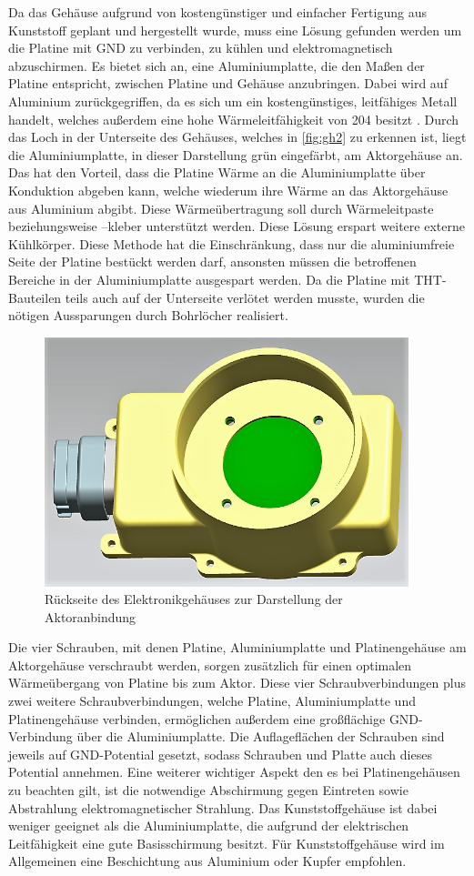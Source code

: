 Da das Gehäuse aufgrund von kostengünstiger und einfacher Fertigung aus Kunststoff geplant und hergestellt wurde, muss eine Lösung gefunden werden um die Platine mit GND zu verbinden, zu kühlen und elektromagnetisch abzuschirmen. Es bietet sich an, eine Aluminiumplatte, die den Maßen der Platine entspricht, zwischen Platine und Gehäuse anzubringen. Dabei wird auf Aluminium zurückgegriffen, da es sich um ein kostengünstiges, leitfähiges Metall handelt, welches außerdem eine hohe Wärmeleitfähigkeit von \SI{204}{} besitzt \cite[S.4]{wuerth}. 
Durch das Loch in der Unterseite des Gehäuses, welches in \autoref{fig:gh2} zu erkennen ist, liegt die Aluminiumplatte, in dieser Darstellung grün eingefärbt, am Aktorgehäuse an. Das hat den Vorteil, dass die Platine Wärme an die Aluminiumplatte über Konduktion abgeben kann, welche wiederum ihre Wärme an das Aktorgehäuse aus Aluminium abgibt. Diese Wärmeübertragung soll durch Wärmeleitpaste beziehungsweise –kleber unterstützt werden. Diese Lösung erspart weitere externe Kühlkörper. Diese Methode hat die Einschränkung, dass nur die aluminiumfreie Seite der Platine bestückt werden darf, ansonsten müssen die betroffenen Bereiche in der Aluminiumplatte ausgespart werden. Da die Platine mit THT-Bauteilen teils auch auf der Unterseite verlötet werden musste, wurden die nötigen Aussparungen durch Bohrlöcher realisiert. 
\begin{figure}[H]%
\centering
\includegraphics[width=300pt]{./Bilder/Elektronik_Gehauese}%
\caption{Rückseite des Elektronikgehäuses zur Darstellung der Aktoranbindung}%
\label{fig:gh2}%
\end{figure}\noindent
Die vier Schrauben, mit denen Platine, Aluminiumplatte und Platinengehäuse am Aktorgehäuse verschraubt werden, sorgen zusätzlich für einen optimalen Wärmeübergang von Platine bis zum Aktor. Diese vier Schraubverbindungen plus zwei weitere Schraubverbindungen, welche Platine, Aluminiumplatte und Platinengehäuse verbinden, ermöglichen außerdem eine großflächige GND-Verbindung über die Aluminiumplatte. Die Auflageflächen der Schrauben sind jeweils auf GND-Potential gesetzt, sodass Schrauben und Platte auch dieses Potential annehmen.
Eine weiterer wichtiger Aspekt den es bei Platinengehäusen zu beachten gilt, ist die notwendige Abschirmung gegen Eintreten sowie Abstrahlung elektromagnetischer Strahlung. Das Kunststoffgehäuse ist dabei weniger geeignet als die Aluminiumplatte, die aufgrund der elektrischen Leitfähigkeit eine gute Basisschirmung besitzt. Für Kunststoffgehäuse wird im Allgemeinen eine Beschichtung aus Aluminium oder Kupfer empfohlen. \cite{Gwinner2006}

